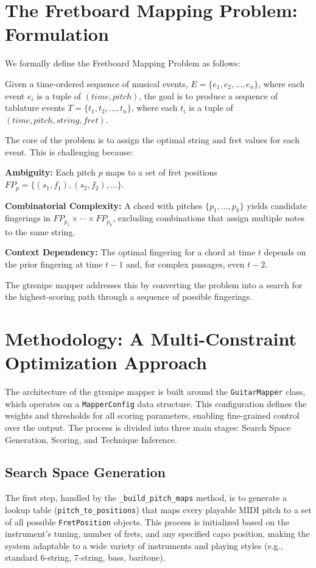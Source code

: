 \documentclass[conference]{IEEEtran}
\begin{document}
\section{The Fretboard Mapping Problem: Formulation}

We formally define the Fretboard Mapping Problem as follows:

Given a time-ordered sequence of musical events, $E = \{e_1, e_2, \ldots, e_n\}$, where each event $e_i$ is a tuple of $(time, pitch)$, the goal is to produce a sequence of tablature events $T = \{t_1, t_2, \ldots, t_n\}$, where each $t_i$ is a tuple of $(time, pitch, string, fret)$.

The core of the problem is to assign the optimal string and fret values for each event. This is challenging because:

\textbf{Ambiguity:} Each pitch $p$ maps to a set of fret positions $FP_p = \{(s_1, f_1), (s_2, f_2), \ldots\}$.

\textbf{Combinatorial Complexity:} A chord with pitches $\{p_1, \ldots, p_k\}$ yields candidate fingerings in $FP_{p_1} \times \cdots \times FP_{p_k}$, excluding combinations that assign multiple notes to the same string.

\textbf{Context Dependency:} The optimal fingering for a chord at time $t$ depends on the prior fingering at time $t-1$ and, for complex passages, even $t-2$.

The gtrsnipe mapper addresses this by converting the problem into a search for the highest-scoring path through a sequence of possible fingerings.

\section{Methodology: A Multi-Constraint Optimization Approach}

The architecture of the gtrsnipe mapper is built around the \texttt{GuitarMapper} class, which operates on a \texttt{MapperConfig} data structure. This configuration defines the weights and thresholds for all scoring parameters, enabling fine-grained control over the output. The process is divided into three main stages: Search Space Generation, Scoring, and Technique Inference.

\subsection{Search Space Generation}

The first step, handled by the \texttt{\_build\_pitch\_maps} method, is to generate a lookup table (\texttt{pitch\_to\_positions}) that maps every playable MIDI pitch to a set of all possible \texttt{FretPosition} objects. This process is initialized based on the instrument's tuning, number of frets, and any specified capo position, making the system adaptable to a wide variety of instruments and playing styles (e.g., standard 6-string, 7-string, bass, baritone).
\end{document}
